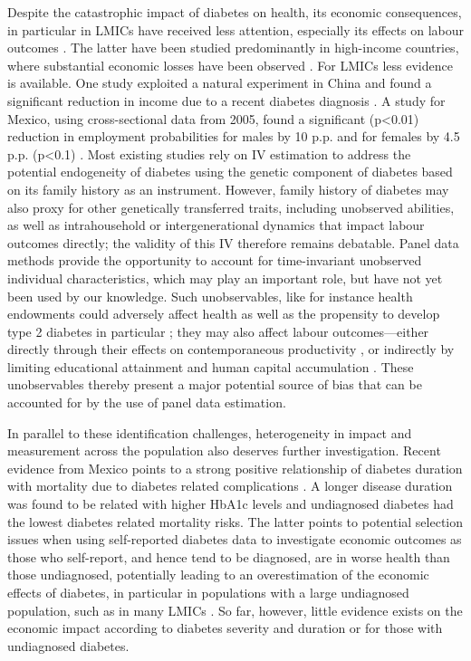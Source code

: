 \documentclass[12pt,english]{article}
\begin{document}
Despite the catastrophic impact of diabetes on health, its economic consequences, in particular in \acp{LMIC} have received less attention, especially its effects on labour outcomes \parencite{Anonymous2007}. The latter have been studied predominantly in high-income countries, where substantial economic losses have been observed \parencite{Brown2005,Brown2014,BrownIII2011,Minor2011,Minor2013,Minor2015,Latif2009}. For \acp{LMIC} less evidence is available. One study exploited a natural experiment in China and found a significant reduction in income due to a recent diabetes diagnosis \parencite{Liu2014}. A study for Mexico, using cross-sectional data from 2005, found a significant (p<0.01) reduction in employment probabilities for males by 10 \ac{p.p.} and for females by 4.5 \ac{p.p.} (p<0.1) \parencite{Anonymous2007}. Most existing studies rely on \ac{IV} estimation to address the potential endogeneity of diabetes using the genetic component of diabetes based on its family history as an instrument.  However, family history of diabetes may also proxy for other genetically transferred traits, including unobserved abilities, as well as  intrahousehold or intergenerational dynamics that impact labour outcomes directly; the validity of this \ac{IV} therefore remains debatable. Panel data methods provide the opportunity to account for time-invariant unobserved individual characteristics, which may play an important role, but have not yet been used by our knowledge. Such unobservables, like for instance health endowments could adversely affect health as well as the propensity to develop type 2 diabetes in particular \parencite{VanEwijk2011,Sotomayor2013,Li2010b}; they may also affect labour outcomes---either directly through their effects on contemporaneous productivity \parencite{Currie2013}, or indirectly by limiting educational attainment and human capital accumulation \parencite{Ayyagari2011a}. These unobservables thereby present a major potential source of bias that can be accounted for by the use of panel data estimation.

In parallel to these identification challenges, heterogeneity in impact and measurement across the population also deserves further investigation. Recent evidence from Mexico points to a strong positive relationship of diabetes duration with mortality due to diabetes related complications \parencite{Herrington2018}. A longer disease duration was found to be related with higher \ac{HbA1c} levels and undiagnosed diabetes had the lowest diabetes related mortality risks. The latter points to potential selection issues when using self-reported diabetes data to investigate economic outcomes as those who self-report, and hence tend to be diagnosed, are in worse health than those undiagnosed, potentially leading to an overestimation of the economic effects of diabetes, in particular in populations with a large undiagnosed population, such as in many \acp{LMIC} \parencite{Beagley2014}. So far, however, little evidence exists on the economic impact according to diabetes severity and duration or for those with undiagnosed diabetes. 
\end{document}
